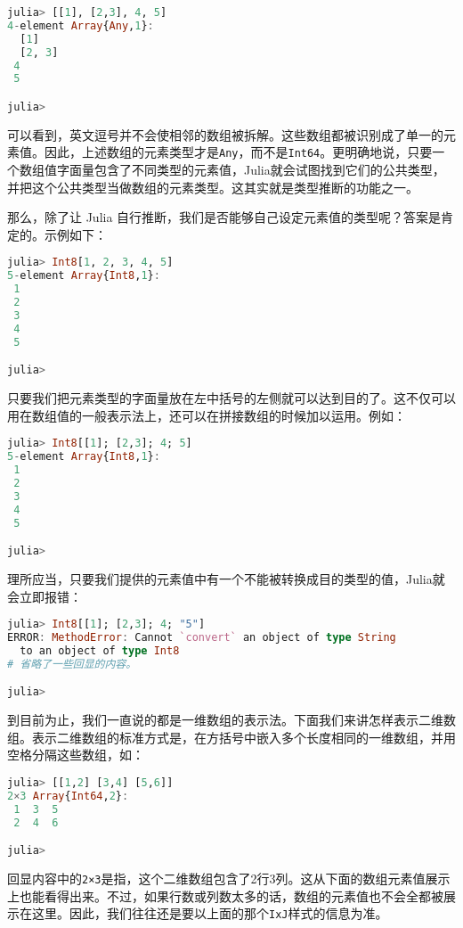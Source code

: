 \begin{lstlisting}[language=julia]
julia> [[1], [2,3], 4, 5]
4-element Array{Any,1}:
  [1]   
  [2, 3]
 4      
 5      

julia> 
\end{lstlisting}

可以看到，英文逗号并不会使相邻的数组被拆解。这些数组都被识别成了单一的元素值。因此，上述数组的元素类型才是\verb`Any`，而不是\verb`Int64`。更明确地说，只要一个数组值字面量包含了不同类型的元素值，Julia就会试图找到它们的公共类型，并把这个公共类型当做数组的元素类型。这其实就是类型推断的功能之一。

那么，除了让 Julia 自行推断，我们是否能够自己设定元素值的类型呢？答案是肯定的。示例如下：

\begin{lstlisting}[language=julia]
julia> Int8[1, 2, 3, 4, 5]
5-element Array{Int8,1}:
 1
 2
 3
 4
 5

julia> 
\end{lstlisting}

只要我们把元素类型的字面量放在左中括号的左侧就可以达到目的了。这不仅可以用在数组值的一般表示法上，还可以在拼接数组的时候加以运用。例如：

\begin{lstlisting}[language=julia]
julia> Int8[[1]; [2,3]; 4; 5]
5-element Array{Int8,1}:
 1
 2
 3
 4
 5

julia> 
\end{lstlisting}

理所应当，只要我们提供的元素值中有一个不能被转换成目的类型的值，Julia就会立即报错：

\begin{lstlisting}[language=julia]
julia> Int8[[1]; [2,3]; 4; "5"]
ERROR: MethodError: Cannot `convert` an object of type String 
  to an object of type Int8
# 省略了一些回显的内容。

julia> 
\end{lstlisting}

到目前为止，我们一直说的都是一维数组的表示法。下面我们来讲怎样表示二维数组。表示二维数组的标准方式是，在方括号中嵌入多个长度相同的一维数组，并用空格分隔这些数组，如：

\begin{lstlisting}[language=julia]
julia> [[1,2] [3,4] [5,6]]
2×3 Array{Int64,2}:
 1  3  5
 2  4  6

julia> 
\end{lstlisting}

回显内容中的\verb`2×3`是指，这个二维数组包含了2行3列。这从下面的数组元素值展示上也能看得出来。不过，如果行数或列数太多的话，数组的元素值也不会全都被展示在这里。因此，我们往往还是要以上面的那个\verb`IxJ`样式的信息为准。

